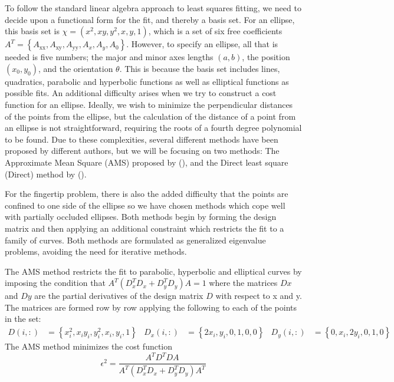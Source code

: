 To follow the standard linear algebra approach to least squares fitting, we need to decide upon a functional form for the fit, and thereby a basis set. For an ellipse, this basis set is $\chi= \left(x^2, x y, y^2, x, y, 1\right)$, which is a set of six free coefficients $ A^T=\left\{A_{\text{xx}},A_{\text{xy}},A_{\text{yy}},A_x,A_y,A_0\right\}$. However, to specify an ellipse, all that is needed is five numbers; the major and minor axes lengths $(a,b)$, the position $(x_0,y_0)$, and the orientation $\theta$. This is because the basis set includes lines, quadratics, parabolic and hyperbolic functions as well as elliptical functions as possible fits. An additional difficulty arises when we try to construct a cost function for an ellipse. Ideally, we wish to minimize the perpendicular distances of the points from the ellipse, but the calculation of the distance of a point from an ellipse is not straightforward, requiring the roots of a fourth degree polynomial to be found. Due to these complexities, several different methods have been proposed by different authors, but we will be focusing on two methods: The Approximate Mean Square (AMS)  proposed by (\cite{Taubin1991}), and the Direct least square (Direct) method by (\cite{Fitzgibbon1999}).


For the fingertip problem, there is also the added difficulty that the points are confined to one side of the ellipse so we have chosen methods which cope well with partially occluded ellipses. Both methods begin by forming the design matrix and then applying an additional constraint which restricts the fit to a family of curves. Both methods are formulated as generalized eigenvalue problems, avoiding the need for iterative methods.

The AMS method restricts the fit to parabolic, hyperbolic and elliptical curves by imposing the condition that $ A^T ( D_x^T D_x  +   D_y^T D_y) A = 1$ where the matrices $Dx$ and $Dy$ are the partial derivatives of the design matrix $D$ with respect to x and y. The matrices are formed row by row applying the following to each of the points in the set:
\begin{align*}
D(i,:)&=\left\{x_i^2, x_i y_i, y_i^2, x_i, y_i, 1\right\} &
D_x(i,:)&=\left\{2 x_i,y_i,0,1,0,0\right\} &
D_y(i,:)&=\left\{0,x_i,2 y_i,0,1,0\right\}
\end{align*}
The AMS method minimizes the cost function
\begin{equation*}
\epsilon ^2=\frac{ A^T D^T D A }{ A^T (D_x^T D_x +  D_y^T D_y) A^T }
\end{equation*}

